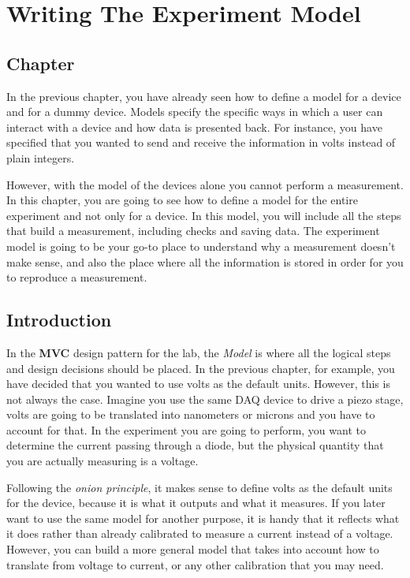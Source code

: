 \chapter{Writing The Experiment Model}\label{chapter:experiment-model}

\section{Chapter}
In the previous chapter, you have already seen how to define a model for
a device and for a dummy device. Models specify the specific ways in
which a user can interact with a device and how data is presented back.
For instance, you have specified that you wanted to send and receive the
information in volts instead of plain integers.

However, with the model of the devices alone you cannot perform a
measurement. In this chapter, you are going to see how to define a model
for the entire experiment and not only for a device. In this model, you
will include all the steps that build a measurement, including checks
and saving data. The experiment model is going to be your go-to place to
understand why a measurement doesn't make sense, and also the place
where all the information is stored in order for you to reproduce
a measurement.

\section{Introduction}
In the \textbf{MVC} design pattern for the lab, the \emph{Model} is
where all the logical steps and design decisions should be placed. In
the previous chapter, for example, you have decided that you wanted to
use volts as the default units. However, this is not always the case.
Imagine you use the same {DAQ} device to drive a piezo stage, volts are
going to be translated into nanometers or microns and you have to
account for that. In the experiment you are going to perform, you want
to determine the current passing through a diode, but the physical quantity that you are actually measuring is a voltage.

Following the \emph{onion principle}, it makes sense to define volts as
the default units for the device, because it is what it outputs and what
it measures. If you later want to use the same model for another
purpose, it is handy that it reflects what it does rather than already
calibrated to measure a current instead of a voltage. However, you can
build a more general model that takes into account how to translate from
voltage to current, or any other calibration that you may need.

